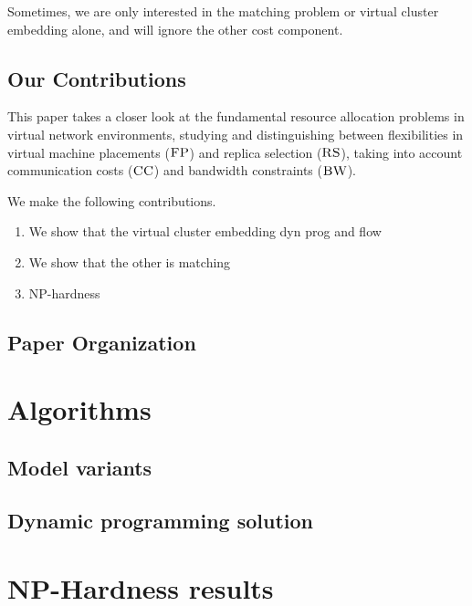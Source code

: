 \documentclass[9pt,twocolumn]{scrartcl}
\newcommand{\CC}{\textsc{CC}}
\newcommand{\FP}{\textsc{FP}}
\newcommand{\RS}{\textsc{RS}}
\newcommand{\BW}{\textsc{BW}}
\begin{document}
Sometimes, we are only interested in the matching problem or virtual cluster embedding alone,
and will ignore the other cost component.




\subsection{Our Contributions}

This paper takes a closer look at the fundamental resource allocation problems
in virtual network environments, studying and distinguishing between flexibilities in virtual machine placements ($\FP$) and
replica selection ($\RS$), taking into account communication costs ($\CC$) and bandwidth constraints ($\BW$).

We make the following contributions.
\begin{enumerate}
\item We show that the virtual cluster embedding dyn prog and flow
\item We show that the other is matching
\item NP-hardness
\end{enumerate}



\subsection{Paper Organization}


\section{Algorithms}

\subsection{Model variants}


\subsection{Dynamic programming solution}




\section{NP-Hardness results}
\end{document}
